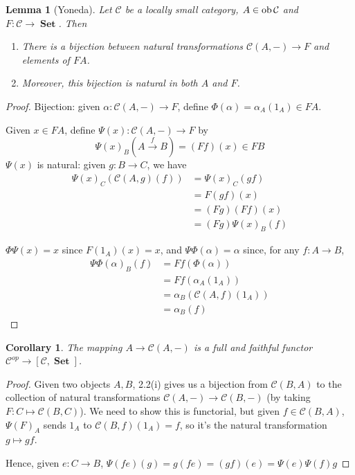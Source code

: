 \documentclass[a4paper]{article}
\newtheorem{lemma}[definition]{Lemma}
\newtheorem{corollary}[definition]{Corollary}
\numberwithin{definition}{section}
\newcommand*\ob[1]{\textnormal{ob}\,#1}
\DeclareMathOperator{\Set}{\textbf{Set}}
\begin{document}
\begin{lemma}[Yoneda]
	Let $\mathcal{C}$ be a locally small category, $A \in \ob \mathcal{C}$ and $F: \mathcal{C} \to \Set$. Then
	\begin{enumerate}[label=\roman*.]
		\item There is a bijection between natural transformations $\mathcal{C}(A, -) \to F$ and elements of $FA$.
		\item Moreover, this bijection is natural in both $A$ and $F$.
	\end{enumerate}
\end{lemma}
\begin{proof}
	Bijection: given $\alpha : \mathcal{C}(A, -) \to F$, define $\Phi(\alpha) = \alpha_A(1_A) \in FA$.
	
	Given $x \in FA$, define $\Psi(x): \mathcal{C}(A, -) \to F$ by $$\Psi(x)_B(A \overset{f}{\to} B) = (Ff)(x) \in FB$$ $\Psi(x)$ is natural: given $g: B \to C$, we have
	\begin{align*}
	\Psi(x)_C(\mathcal{C}(A, g)(f)) &= \Psi(x)_C(gf) \\
	&= F(gf)(x) \\
	&= (Fg)(Ff)(x) \\
	&= (Fg)\Psi(x)_B(f)
	\end{align*}
	
	$\Phi\Psi(x) = x$ since $F(1_A)(x) = x$, and $\Psi\Phi(\alpha) = \alpha$ since, for any $f: A \to B$,
	\begin{align*}
	\Psi\Phi(\alpha)_B(f) &= Ff(\Phi(\alpha)) \\
	&= Ff(\alpha_A(1_A)) \\
	&= \alpha_B(\mathcal{C}(A,f)(1_A)) \\
	&= \alpha_B(f)
	\end{align*}
\end{proof}

\begin{corollary}
	The mapping $A \to \mathcal{C}(A, -)$ is a full and faithful functor $\mathcal{C}^{op} \to [\mathcal{C}, \Set]$.
\end{corollary}
\begin{proof}
	Given two objects $A,B$, 2.2(i) gives us a bijection from $\mathcal{C}(B,A)$ to the collection of natural transformations $\mathcal{C}(A, -) \to \mathcal{C}(B, -)$ (by taking $F: C \mapsto \mathcal{C}(B, C)$). We need to show this is functorial, but given $f \in \mathcal{C}(B, A)$, $\Psi(F)_A$ sends $1_A$ to $\mathcal{C}(B, f)(1_A) = f$, so it's the natural transformation $g \mapsto gf$.
	
	Hence, given $e: C \to B$, $\Psi(fe)(g) = g(fe) = (gf)(e) = \Psi(e)\Psi(f)g$
\end{proof}
\end{document}

